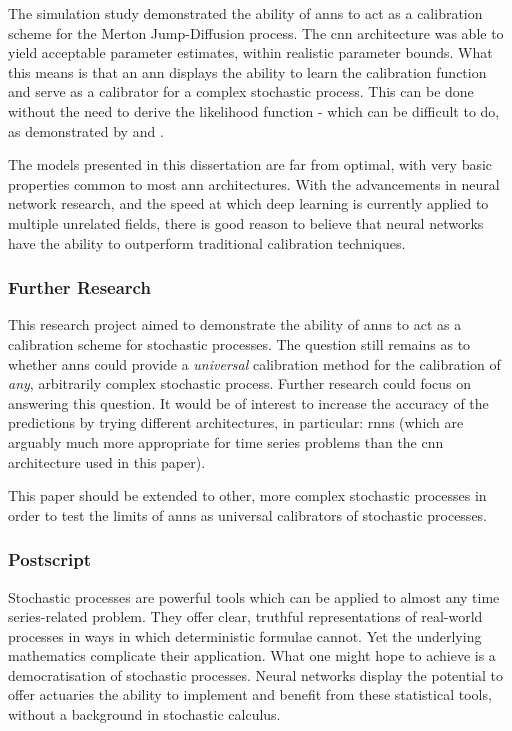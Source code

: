 \documentclass[11pt,oneside,openany,a4paper,english, report, goldenblock
]{usthesis}
\begin{document}
The simulation study demonstrated the ability of \acrshort{ann}s to act as a calibration scheme for the Merton Jump-Diffusion process. The \acrshort{cnn} architecture was able to yield acceptable parameter estimates, within realistic parameter bounds. What this means is that an \acrshort{ann} displays the ability to learn the calibration function and serve as a calibrator for a complex stochastic process. This can be done without the need to derive the likelihood function - which can be difficult to do, as demonstrated by \citet{Honore} and \citet{Mongwe}.

The models presented in this dissertation are far from optimal, with very basic properties common to most \acrshort{ann} architectures. With the advancements in neural network research, and the speed at which deep learning is currently applied to multiple unrelated fields, there is good reason to believe that neural networks have the ability to outperform traditional calibration techniques. 

\subsubsection{Further Research}
This research project aimed to demonstrate the ability of \acrshort{ann}s to act as a calibration scheme for stochastic processes. The question still remains as to whether \acrshort{ann}s could provide a \textit{universal} calibration method for the calibration of \textit{any}, arbitrarily complex stochastic process. Further research could focus on answering this question. It would be of interest to increase the accuracy of the predictions by trying different architectures, in particular: \acrshort{rnn}s (which are arguably much more appropriate for time series problems than the \acrshort{cnn} architecture used in this paper).

This paper should be extended to other, more complex stochastic processes in order to test the limits of \acrshort{ann}s as universal calibrators of stochastic processes. 

\subsubsection{Postscript}

Stochastic processes are powerful tools which can be applied to almost any time series-related problem. They offer clear, truthful representations of real-world processes in ways in which deterministic formulae cannot. Yet the underlying mathematics complicate their application. What one might hope to achieve is a democratisation of stochastic processes. Neural networks display the potential to offer actuaries the ability to implement and benefit from these statistical tools, without a background in stochastic calculus.
\end{document}
